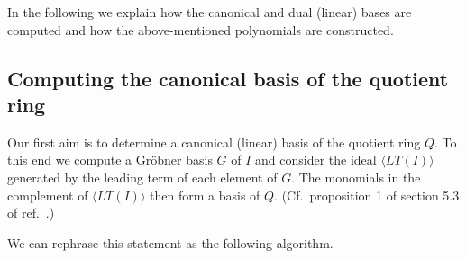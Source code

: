 \documentclass[dvipsnames,preprint,12pt,sort&compress]{elsarticle}
\begin{document}
In the following we explain how the canonical and dual (linear) bases are computed
and how the above-mentioned polynomials are constructed.



\subsection{Computing the canonical basis of the quotient ring}

Our first aim is to determine a canonical (linear) basis of the quotient ring $Q$.
To this end we compute a Gr{\"o}bner basis $G$ of $I$ and consider the
ideal $\langle LT(I) \rangle$ generated by the leading term of each element of $G$.
The monomials in the complement of $\langle LT(I) \rangle$ then form a basis of $Q$.
(Cf.~proposition 1 of section 5.3 of ref.~\cite{IdealsVarietiesAlgorithms}.)

We can rephrase this statement as the following algorithm.
\end{document}
